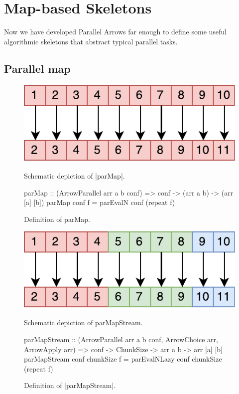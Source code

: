 
\section{Map-based Skeletons}
\label{sec:map-skeletons}
Now we have developed Parallel Arrows far enough to define some useful algorithmic skeletons that abstract typical parallel tasks.

\subsection{Parallel map}

\begin{figure}[h]
\includegraphics[scale=0.7]{images/parMap}
\caption{Schematic depiction of |parMap|.}
\label{fig:parMapImg}

\begin{code}
parMap :: (ArrowParallel arr a b conf) => conf -> (arr a b) -> (arr [a] [b])
parMap conf f = parEvalN conf (repeat f)
\end{code}
\caption{Definition of parMap.}
\label{fig:parMap}

\includegraphics[scale=0.7]{images/parMapStream}
\caption{Schematic depiction of parMapStream.}
\label{fig:parMapStreamImg}

\begin{code}
parMapStream :: (ArrowParallel arr a b conf, ArrowChoice arr, ArrowApply arr) =>
	conf -> ChunkSize -> arr a b -> arr [a] [b]
parMapStream conf chunkSize f = parEvalNLazy conf chunkSize (repeat f)
\end{code}
\caption{Definition of |parMapStream|.}
\label{fig:parMapStream}
\end{figure}

